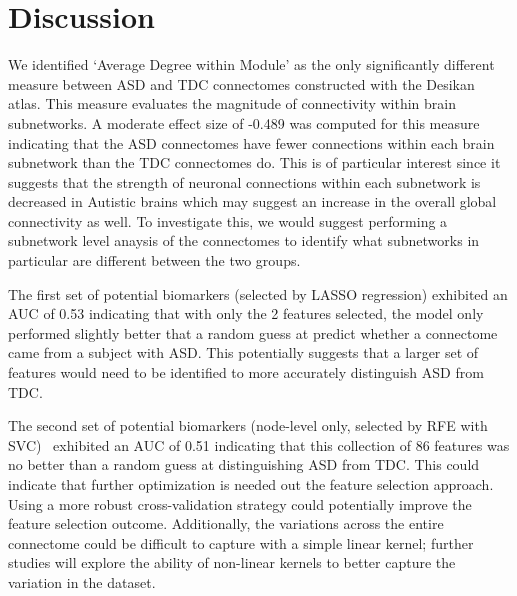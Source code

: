 \documentclass[11pt,conference]{IEEEtran}
\begin{document}

\section{Discussion}

We identified `Average Degree within Module' as the only significantly different measure
between ASD and TDC connectomes constructed with the Desikan atlas. This measure evaluates 
the magnitude of connectivity within brain subnetworks. A moderate effect size of -0.489 
was computed for this measure indicating that the ASD connectomes have fewer connections
within each brain subnetwork than the TDC connectomes do. This is of particular interest
since it suggests that the strength of neuronal connections within each subnetwork is 
decreased in Autistic brains which may suggest an increase in the overall global connectivity 
as well. To investigate this, we would suggest performing a subnetwork level anaysis of the 
connectomes to identify what subnetworks in particular are different between the two groups. 

The first set of potential biomarkers (selected by LASSO regression) exhibited an AUC of 
0.53 indicating that with only the 2 features selected, the model only performed slightly 
better that a random guess at predict whether a connectome came from a subject with ASD. 
This potentially suggests that a larger set of features would need to be identified to more 
accurately distinguish ASD from TDC.

The second set of potential biomarkers (node-level only, selected by RFE with SVC) \
exhibited an AUC of 0.51 indicating that this collection of 86 features was no better than 
a random guess at distinguishing ASD from TDC. This could indicate that further 
optimization is needed out the feature selection approach. Using a more robust 
cross-validation strategy could potentially improve the feature selection outcome. 
Additionally, the variations across the entire connectome could be difficult to capture 
with a simple linear kernel; further studies will explore the ability of non-linear 
kernels to better capture the variation in the dataset.
\end{document}
